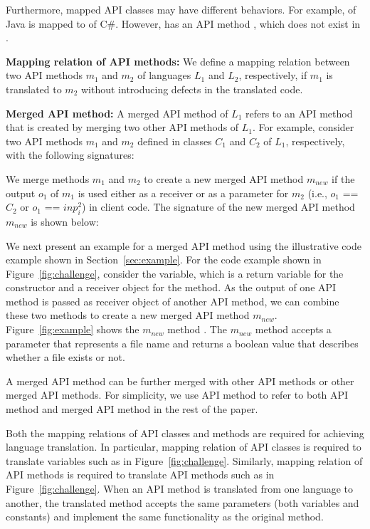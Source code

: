Furthermore, mapped API classes may have different behaviors. For
example,  of Java is mapped to
 of C\#. However,  has
an API method , which does not exist in
.

\textbf{Mapping relation of API methods:} We define a mapping relation
between two API methods $m_1$ and $m_2$ of languages $L_1$ and $L_2$,
respectively, if $m_1$ is translated to $m_2$ without introducing defects
in the translated code.

\textbf{Merged API method:} A merged API method of $L_1$ refers to
an API method that is created by merging two other API methods of
$L_1$. For example, consider two API methods $m_1$ and $m_2$ defined
in classes $C_1$ and $C_2$ of $L_1$, respectively, with the
following signatures:



We merge methods $m_1$ and $m_2$ to create a new merged API method $m_{new}$ if the
output $o_1$ of $m_1$ is used either as a receiver or as a
parameter for $m_2$ (i.e., $o_1$ == $C_2$ or $o_1$ == $inp_i^2$)
in client code. The signature of the new merged API method $m_{new}$ is
shown below:


We next present an example for a merged API method using the
illustrative code example shown in Section~\ref{sec:example}. For
the code example shown in Figure~\ref{fig:challenge}, consider the
 variable, which is a return variable for the
constructor and a receiver object for the  method. As
the output of one API method is passed as receiver object of another
API method, we can combine these two methods to create a new merged
API method $m_{new}$. Figure~\ref{fig:example} shows the $m_{new}$
method . The $m_{new}$ method
accepts a  parameter that represents a file name and
returns a boolean value that describes whether a file exists or not.

A merged API method can be further merged with other API methods or
other merged API methods. For simplicity, we use API method to refer
to both API method and merged API method in the rest of the paper.

Both the mapping relations of API classes and methods are required
for achieving language translation. In particular, mapping relation
of API classes is required to translate variables such as
 in Figure~\ref{fig:challenge}. Similarly, mapping
relation of API methods is required to translate API methods such as
 in Figure~\ref{fig:challenge}. When an API method is
translated from one language to another, the translated method
accepts the same parameters (both variables and constants) and
implement the same functionality as the original method.
